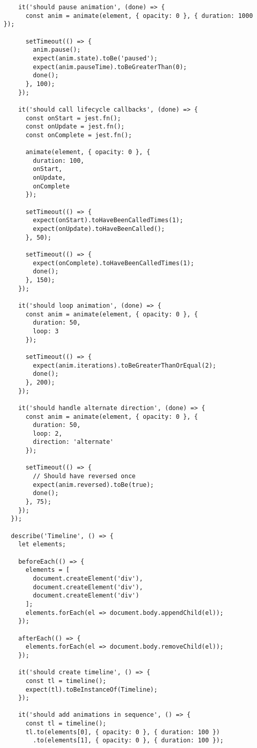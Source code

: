 \documentclass[11pt]{article}
\begin{document}
\begin{verbatim}
    it('should pause animation', (done) => {
      const anim = animate(element, { opacity: 0 }, { duration: 1000 });
      
      setTimeout(() => {
        anim.pause();
        expect(anim.state).toBe('paused');
        expect(anim.pauseTime).toBeGreaterThan(0);
        done();
      }, 100);
    });
    
    it('should call lifecycle callbacks', (done) => {
      const onStart = jest.fn();
      const onUpdate = jest.fn();
      const onComplete = jest.fn();
      
      animate(element, { opacity: 0 }, {
        duration: 100,
        onStart,
        onUpdate,
        onComplete
      });
      
      setTimeout(() => {
        expect(onStart).toHaveBeenCalledTimes(1);
        expect(onUpdate).toHaveBeenCalled();
      }, 50);
      
      setTimeout(() => {
        expect(onComplete).toHaveBeenCalledTimes(1);
        done();
      }, 150);
    });
    
    it('should loop animation', (done) => {
      const anim = animate(element, { opacity: 0 }, {
        duration: 50,
        loop: 3
      });
      
      setTimeout(() => {
        expect(anim.iterations).toBeGreaterThanOrEqual(2);
        done();
      }, 200);
    });
    
    it('should handle alternate direction', (done) => {
      const anim = animate(element, { opacity: 0 }, {
        duration: 50,
        loop: 2,
        direction: 'alternate'
      });
      
      setTimeout(() => {
        // Should have reversed once
        expect(anim.reversed).toBe(true);
        done();
      }, 75);
    });
  });
  
  describe('Timeline', () => {
    let elements;
    
    beforeEach(() => {
      elements = [
        document.createElement('div'),
        document.createElement('div'),
        document.createElement('div')
      ];
      elements.forEach(el => document.body.appendChild(el));
    });
    
    afterEach(() => {
      elements.forEach(el => document.body.removeChild(el));
    });
    
    it('should create timeline', () => {
      const tl = timeline();
      expect(tl).toBeInstanceOf(Timeline);
    });
    
    it('should add animations in sequence', () => {
      const tl = timeline();
      tl.to(elements[0], { opacity: 0 }, { duration: 100 })
        .to(elements[1], { opacity: 0 }, { duration: 100 });
      

\end{verbatim}
\end{document}
